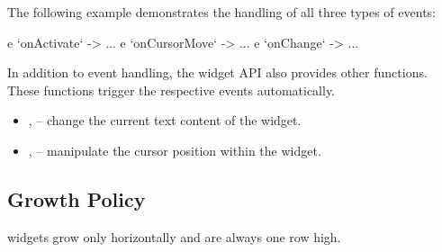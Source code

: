 The following example demonstrates the handling of all three types of
events:

\begin{haskellcode}
 e `onActivate` \this -> ...
 e `onCursorMove` \pos -> ...
 e `onChange` \newVal -> ...
\end{haskellcode}

In addition to event handling, the  widget API also provides
other functions.  These functions trigger the respective events
automatically.

\begin{itemize}
\item {},  -- change the current text
  content of the  widget.
\item {},  --
  manipulate the cursor position within the  widget.
\end{itemize}

\subsection{Growth Policy}

 widgets grow only horizontally and are always one row high.

